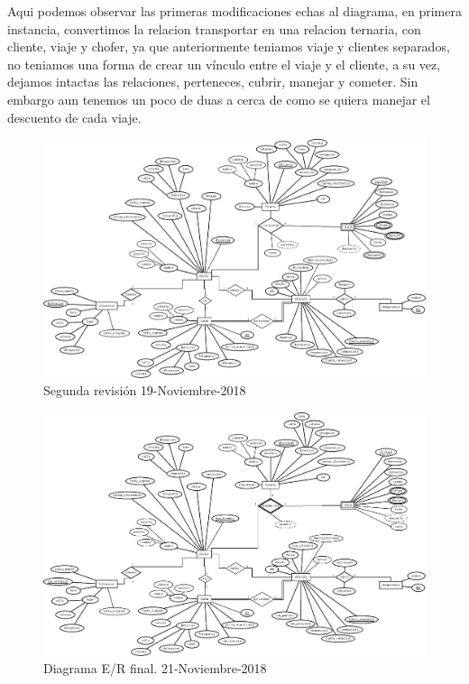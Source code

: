 \documentclass{article}
\begin{document}
Aqui podemos observar las primeras modificaciones echas al diagrama, en primera instancia, convertimos la relacion transportar en una relacion ternaria, con cliente, viaje y chofer, ya que anteriormente teniamos viaje y clientes separados, no teniamos una forma de crear un vínculo entre el viaje y el cliente, a su vez, dejamos intactas las relaciones, perteneces, cubrir, manejar y cometer. Sin embargo aun tenemos un poco de duas a cerca de como se quiera manejar el descuento de cada viaje.\\

\begin{figure}[H]
\begin{center}
\includegraphics[width=5in]{./img/R_boceto2.jpeg}
\caption{Segunda revisión 19-Noviembre-2018}
\end{center}
\end{figure}


\begin{figure}[H]
\begin{center}
\includegraphics[width=5in]{./img/R_boceto3.jpeg}
\caption{Diagrama E/R final. 21-Noviembre-2018 }
\end{center}
\end{figure}
\end{document}
